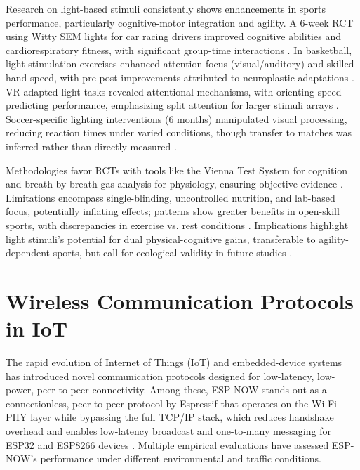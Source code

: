 	Research on light-based stimuli consistently shows enhancements in sports performance, particularly cognitive-motor integration and agility. A 6-week RCT using Witty SEM lights for car racing drivers improved cognitive abilities and cardiorespiratory fitness, with significant group-time interactions \parencite{Horvath:2022:ARA}. In basketball, light stimulation exercises enhanced attention focus (visual/auditory) and skilled hand speed, with pre-post improvements attributed to neuroplastic adaptations \parencite{Shimi:2025:AML}. VR-adapted light tasks revealed attentional mechanisms, with orienting speed predicting performance, emphasizing split attention for larger stimuli arrays \parencite{Shimi:2025:AML}. Soccer-specific lighting interventions (6 months) manipulated visual processing, reducing reaction times under varied conditions, though transfer to matches was inferred rather than directly measured \parencite{Theofilou:2022:EVS}.
	
	Methodologies favor RCTs with tools like the Vienna Test System for cognition and breath-by-breath gas analysis for physiology, ensuring objective evidence \parencite{Horvath:2022:ARA}. Limitations encompass single-blinding, uncontrolled nutrition, and lab-based focus, potentially inflating effects; patterns show greater benefits in open-skill sports, with discrepancies in exercise vs. rest conditions \parencite{Zhao:2024:RPS}. Implications highlight light stimuli's potential for dual physical-cognitive gains, transferable to agility-dependent sports, but call for ecological validity in future studies \parencite{Shimi:2025:AML}.


\section{Wireless Communication Protocols in IoT}

	The rapid evolution of Internet of Things (IoT) and embedded-device systems has introduced novel communication protocols designed for low-latency, low-power, peer-to-peer connectivity. Among these, ESP-NOW stands out as a connectionless, peer-to-peer protocol by Espressif that operates on the Wi-Fi PHY layer while bypassing the full TCP/IP stack, which reduces handshake overhead and enables low-latency broadcast and one-to-many messaging for ESP32 and ESP8266 devices \parencite{Becker:2025:POE}. Multiple empirical evaluations have assessed ESP-NOW’s performance under different environmental and traffic conditions.
	
